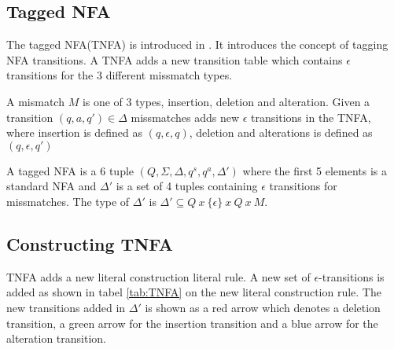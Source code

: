 \subsection{Tagged NFA}
\label{sec:tnfa}
The tagged NFA(TNFA) is introduced in \cite{Ville}. It introduces the concept of tagging NFA transitions. A TNFA adds a new transition table which contains $\epsilon$ transitions for the 3 different missmatch types.
\begin{mydef}
A mismatch $M$ is one of 3 types, insertion, deletion and alteration. Given a transition $(q,a,q') \in \Delta$ missmatches adds new $\epsilon$ transitions in the TNFA, where insertion is  defined as $(q,\epsilon,q)$, deletion and alterations is defined as $(q,\epsilon,q')$
\end{mydef}
\begin{mydef}
A tagged NFA is a 6 tuple $(Q,\Sigma,\Delta,q^s,q^a,\Delta')$ where the first 5 elements is a standard NFA and $\Delta'$ is a set of 4 tuples containing $\epsilon$ transitions for missmatches. The type of $\Delta'$ is $\Delta' \subseteq Q ~x~ \{\epsilon\} ~x~ Q ~x~ M$.  
\end{mydef}

\subsection{Constructing TNFA}
TNFA adds a new literal construction literal rule. A new set of $\epsilon$-transitions is added as shown in tabel \ref{tab:TNFA} on the new literal construction rule. The new transitions added in $\Delta'$ is shown as a red arrow which denotes a deletion transition, a green arrow for the insertion transition and a blue arrow for the alteration transition.



